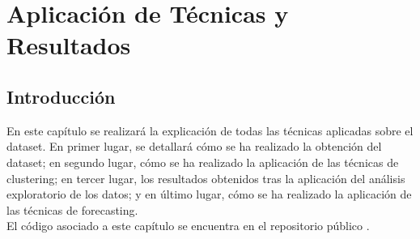 
\chapter{Aplicación de Técnicas y Resultados} %
\label{chap:results} %


\section{Introducción}

En este capítulo se realizará la explicación de todas las técnicas aplicadas sobre el dataset. En primer lugar, se detallará cómo se ha realizado la obtención del dataset; en segundo lugar, cómo se ha realizado la aplicación de las técnicas de clustering; en tercer lugar, los resultados obtenidos tras la aplicación del análisis exploratorio de los datos; y en último lugar, cómo se ha realizado la aplicación de las técnicas de forecasting. \\

El código asociado a este capítulo se encuentra en el repositorio público \citep{master}.





\newpage

